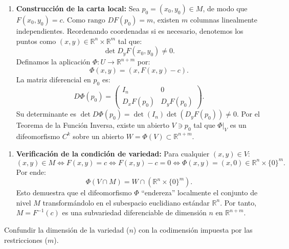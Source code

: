 \documentclass[11pt,a4paper]{article}
\begin{document}
\begin{enumerate}[label=\textbf{\arabic*.}]
\item \textbf{Construcción de la carta local:}
Sea $p_0 = (x_0, y_0) \in M$, de modo que $F(x_0, y_0) = c$.
Como $\text{rango } DF(p_0) = m$, existen $m$ columnas linealmente independientes. Reordenando coordenadas si es necesario, denotemos los puntos como $(x,y) \in \mathbb{R}^n \times \mathbb{R}^m$ tal que:
\begin{equation*}
\det D_y F(x_0, y_0) \neq 0.
\end{equation*}
Definamos la aplicación $\Phi: U \to \mathbb{R}^{n+m}$ por:
\begin{equation*}
\Phi(x,y) = (x, F(x,y) - c).
\end{equation*}
La matriz diferencial en $p_0$ es:
\begin{equation*}
D\Phi(p_0) = \begin{pmatrix} I_n & 0 \\ D_x F(p_0) & D_y F(p_0) \end{pmatrix}.
\end{equation*}
Su determinante es $\det D\Phi(p_0) = \det(I_n) \det(D_y F(p_0)) \neq 0$.
Por el Teorema de la Función Inversa, existe un abierto $V \ni p_0$ tal que $\Phi|_V$ es un difeomorfismo $C^k$ sobre un abierto $W = \Phi(V) \subset \mathbb{R}^{n+m}$.
\end{enumerate}

\begin{enumerate}[label=\textbf{\arabic*.}]
\item \textbf{Verificación de la condición de variedad:}
Para cualquier $(x,y) \in V$:
\begin{equation*}
(x,y) \in M \iff F(x,y) = c \iff F(x,y) - c = 0 \iff \Phi(x,y) = (x, 0) \in \mathbb{R}^n \times \{0\}^m.
\end{equation*}
Por ende:
\begin{equation*}
\Phi(V \cap M) = W \cap (\mathbb{R}^n \times \{0\}^m).
\end{equation*}
Esto demuestra que el difeomorfismo $\Phi$ ``endereza'' localmente el conjunto de nivel $M$ transformándolo en el subespacio euclidiano estándar $\mathbb{R}^n$.
Por tanto, $M = F^{-1}(c)$ es una subvariedad diferenciable de dimensión $n$ en $\mathbb{R}^{n+m}$.
\end{enumerate}

\begin{trapbox}
Confundir la dimensión de la variedad ($n$) con la codimensión impuesta por las restricciones ($m$).
\end{trapbox}
\end{document}
